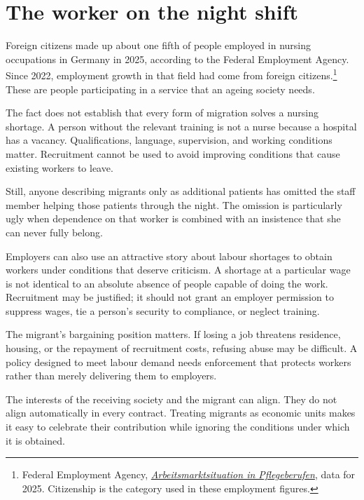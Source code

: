 \documentclass[12pt,a4paper]{book}
\begin{document}
\section*{The worker on the night shift}

Foreign citizens made up about one fifth of people employed in nursing occupations in Germany in 2025, according to the Federal Employment Agency. Since 2022, employment growth in that field had come from foreign citizens.\footnote{Federal Employment Agency, \href{https://statistik.arbeitsagentur.de/DE/Statischer-Content/Statistiken/Themen-im-Fokus/Berufe/Online-KV/Pflege.html}{\emph{Arbeitsmarktsituation in Pflegeberufen}}, data for 2025. Citizenship is the category used in these employment figures.} These are people participating in a service that an ageing society needs.

The fact does not establish that every form of migration solves a nursing shortage. A person without the relevant training is not a nurse because a hospital has a vacancy. Qualifications, language, supervision, and working conditions matter. Recruitment cannot be used to avoid improving conditions that cause existing workers to leave.

Still, anyone describing migrants only as additional patients has omitted the staff member helping those patients through the night. The omission is particularly ugly when dependence on that worker is combined with an insistence that she can never fully belong.

Employers can also use an attractive story about labour shortages to obtain workers under conditions that deserve criticism. A shortage at a particular wage is not identical to an absolute absence of people capable of doing the work. Recruitment may be justified; it should not grant an employer permission to suppress wages, tie a person's security to compliance, or neglect training.

The migrant's bargaining position matters. If losing a job threatens residence, housing, or the repayment of recruitment costs, refusing abuse may be difficult. A policy designed to meet labour demand needs enforcement that protects workers rather than merely delivering them to employers.

The interests of the receiving society and the migrant can align. They do not align automatically in every contract. Treating migrants as economic units makes it easy to celebrate their contribution while ignoring the conditions under which it is obtained.
\end{document}
